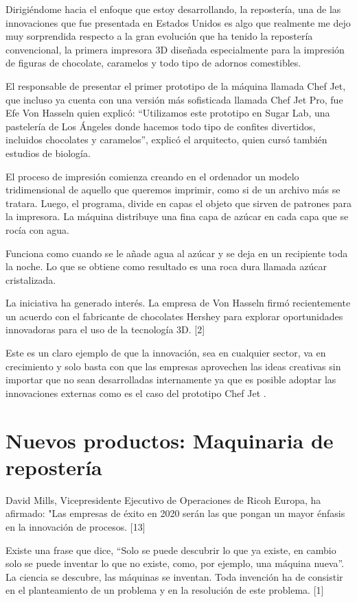 \documentclass{bmcart}
\begin{document}
Dirigiéndome hacia el enfoque que estoy desarrollando, la repostería, una de las innovaciones que fue presentada en Estados Unidos es algo que realmente me dejo muy sorprendida respecto a la gran evolución que ha tenido la repostería convencional, la primera impresora 3D diseñada especialmente para la impresión de figuras de chocolate, caramelos y todo tipo de adornos comestibles.


El responsable de presentar el primer prototipo de la máquina llamada Chef Jet, que incluso ya cuenta con una versión más sofisticada llamada Chef Jet Pro, fue Efe Von Hasseln quien explicó: “Utilizamos este prototipo en Sugar Lab, una pastelería de Los Ángeles donde hacemos todo tipo de confites divertidos, incluidos chocolates y caramelos”, explicó el arquitecto, quien cursó también estudios de biología.

El proceso de impresión comienza creando en el ordenador un modelo tridimensional de aquello que queremos imprimir, como si de un archivo más se tratara. Luego, el programa, divide en capas el objeto que sirven de patrones para la impresora. La máquina distribuye una fina capa de azúcar en cada capa que se rocía con agua.


Funciona como cuando se le añade agua al azúcar y se deja en un recipiente toda la noche. Lo que se obtiene como resultado es una roca dura llamada azúcar cristalizada.


La iniciativa ha generado interés. La empresa de Von Hasseln firmó recientemente un acuerdo con el fabricante de chocolates Hershey para explorar oportunidades innovadoras para el uso de la tecnología 3D. [2]

Este es un claro ejemplo de que la innovación, sea en cualquier sector, va en crecimiento y solo basta con que las empresas aprovechen las ideas creativas sin importar que no sean desarrolladas internamente ya que es posible adoptar las innovaciones externas como es el caso del prototipo Chef Jet .

\section{Nuevos productos: Maquinaria de repostería}

David Mills, Vicepresidente Ejecutivo de Operaciones de Ricoh Europa, ha afirmado: "Las empresas de éxito en 2020 serán las que pongan un mayor énfasis en la innovación de procesos. [13]

Existe una frase que dice, “Solo se puede descubrir lo que ya existe, en cambio solo se puede inventar lo que no existe, como, por ejemplo, una máquina nueva”. La ciencia se descubre, las máquinas se inventan. Toda invención ha de consistir en el planteamiento de un problema y en la resolución de este problema. [1]
\end{document}
